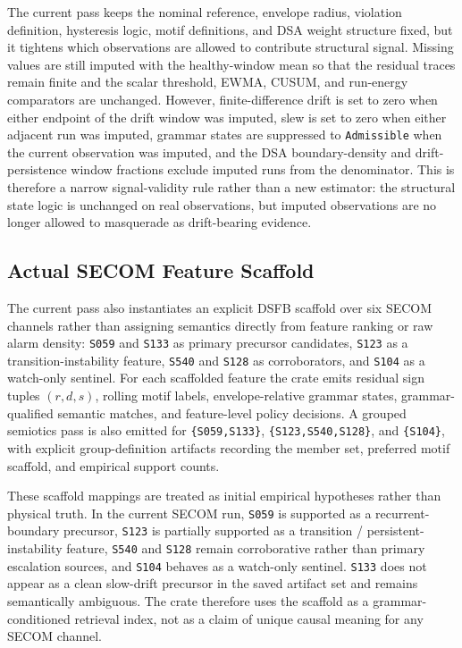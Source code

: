 \documentclass[11pt,letterpaper]{article}
\theoremstyle{scresult}
\begin{document}
The current pass keeps the nominal reference, envelope radius, violation
definition, hysteresis logic, motif definitions, and DSA weight structure
fixed, but it tightens which observations are allowed to contribute structural
signal. Missing values are still imputed with the healthy-window mean so that
the residual traces remain finite and the scalar threshold, EWMA, CUSUM, and
run-energy comparators are unchanged. However, finite-difference drift is set
to zero when either endpoint of the drift window was imputed, slew is set to
zero when either adjacent run was imputed, grammar states are suppressed to
\texttt{Admissible} when the current observation was imputed, and the DSA
boundary-density and drift-persistence window fractions exclude imputed runs
from the denominator. This is therefore a narrow signal-validity rule rather
than a new estimator: the structural state logic is unchanged on real
observations, but imputed observations are no longer allowed to masquerade as
drift-bearing evidence.

\subsection{Actual SECOM Feature Scaffold}

The current pass also instantiates an explicit DSFB scaffold over six SECOM
channels rather than assigning semantics directly from feature ranking or raw
alarm density: \texttt{S059} and \texttt{S133} as primary precursor
candidates, \texttt{S123} as a transition-instability feature,
\texttt{S540} and \texttt{S128} as corroborators, and \texttt{S104} as a
watch-only sentinel. For each scaffolded feature the crate emits residual
sign tuples $(r,d,s)$, rolling motif labels, envelope-relative grammar states,
grammar-qualified semantic matches, and feature-level policy decisions. A
grouped semiotics pass is also emitted for
\texttt{\{S059,S133\}}, \texttt{\{S123,S540,S128\}}, and \texttt{\{S104\}},
with explicit group-definition artifacts recording the member set, preferred
motif scaffold, and empirical support counts.

These scaffold mappings are treated as initial empirical hypotheses rather
than physical truth. In the current SECOM run, \texttt{S059} is supported as a
recurrent-boundary precursor, \texttt{S123} is partially supported as a
transition / persistent-instability feature, \texttt{S540} and \texttt{S128}
remain corroborative rather than primary escalation sources, and
\texttt{S104} behaves as a watch-only sentinel. \texttt{S133} does not appear
as a clean slow-drift precursor in the saved artifact set and remains
semantically ambiguous. The crate therefore uses the scaffold as a
grammar-conditioned retrieval index, not as a claim of unique causal meaning
for any SECOM channel.
\end{document}
